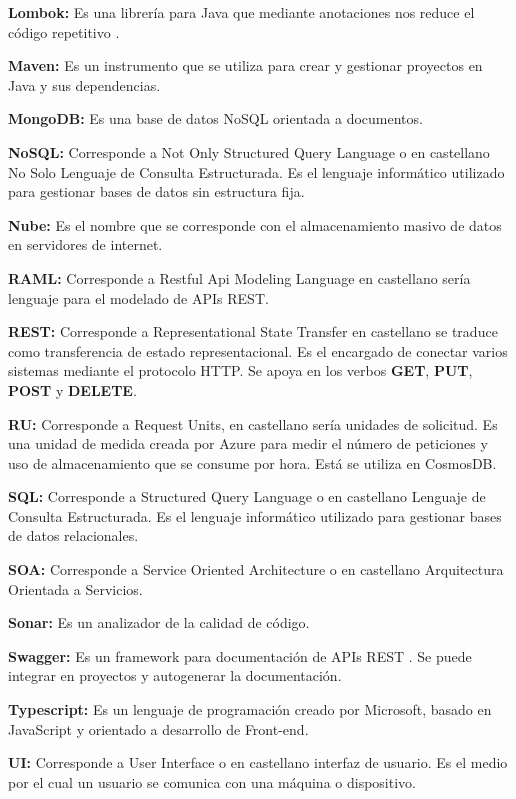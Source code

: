 \documentclass[12pt]{report} %
\begin{document}
\textbf{Lombok:} Es una librería para Java que mediante anotaciones nos reduce el código repetitivo \cite{lombok}. 

\textbf{Maven:} Es un instrumento que se utiliza para crear y gestionar proyectos en Java y sus dependencias.

\textbf{MongoDB:} Es una base de datos NoSQL orientada a documentos.

\textbf{NoSQL:} Corresponde a Not Only Structured Query Language o en castellano No Solo Lenguaje de Consulta Estructurada. Es el lenguaje informático utilizado para gestionar bases de datos sin estructura fija.

\textbf{Nube:} Es el nombre que se corresponde con el almacenamiento masivo de datos en servidores de internet.

\textbf{RAML:} Corresponde a Restful Api Modeling Language en castellano sería lenguaje para el modelado de APIs REST.

\textbf{REST:} Corresponde a Representational State Transfer en castellano se traduce como transferencia de estado representacional. Es el encargado de conectar varios sistemas mediante el protocolo HTTP. Se apoya en los verbos \textbf{GET}, \textbf{PUT}, \textbf{POST} y  \textbf{DELETE}.

\textbf{RU:} Corresponde a Request Units, en castellano sería unidades de solicitud. Es una unidad de medida creada por Azure para medir el número de peticiones y uso de almacenamiento que se consume por hora. Está se utiliza en CosmosDB.

\textbf{SQL:} Corresponde a Structured Query Language o en castellano Lenguaje de Consulta Estructurada. Es el lenguaje informático utilizado para gestionar bases de datos relacionales.

\textbf{SOA:} Corresponde a Service Oriented Architecture o en castellano Arquitectura Orientada a Servicios.

\textbf{Sonar:} Es un analizador de la calidad de código.

\textbf{Swagger:} Es un framework para documentación de APIs REST \cite{swagger}. Se puede integrar en proyectos y autogenerar la documentación.

\textbf{Typescript:} Es un lenguaje de programación creado por Microsoft, basado en JavaScript y orientado a desarrollo de Front-end.

\textbf{UI:} Corresponde a User Interface o en castellano interfaz de usuario. Es el medio por el cual un usuario se comunica con una máquina o dispositivo.
\end{document}
